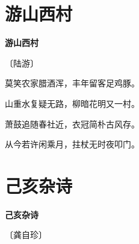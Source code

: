 \documentclass[12pt,UTF-8,openany,fontset=none]{ctexbook}
\begin{document}
\vspace{8pt}
\clearpage

\section{游山西村}


\begin{center}
    {\bfseries 游山西村}

    \vspace{18pt}

    \begin{large}\xuwen
        〔陆游〕
    \end{large}

\end{center}

    \vspace{18pt}  %

\begin{center}
    \begin{Large}

        莫笑农家腊酒浑，丰年留客足鸡豚。

        山重水复疑无路，柳暗花明又一村。

        萧鼓追随春社近，衣冠简朴古风存。

        从今若许闲乘月，拄杖无时夜叩门。

    \end{Large}

\end{center}

\vspace{8pt}
\clearpage

\section{己亥杂诗}


\begin{center}
    {\bfseries 己亥杂诗}

    \vspace{18pt}

    \begin{large}\xuwen
        〔龚自珍〕
    \end{large}

\end{center}

    \vspace{18pt}  %
\end{document}
